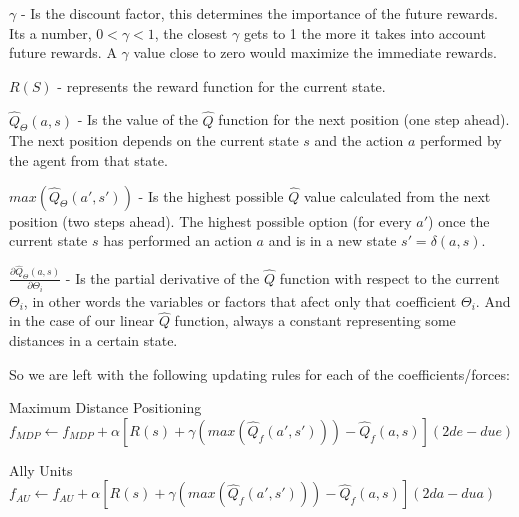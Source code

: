 \begin{flushleft}
$\gamma$  - Is the discount factor, this determines the importance of the future rewards. Its a number, $0 < \gamma < 1$, the closest $\gamma$ gets to 1 the more it takes into account future rewards. A $\gamma$ value close to zero would maximize the immediate rewards. 
\end{flushleft} 

\begin{flushleft}
$R(S)$ -  represents the reward function for the current state.
\end{flushleft} 

\begin{flushleft}
$\hat{Q}_\Theta(a,s)$ - Is the value of the $\hat{Q}$ function for the next position (one step ahead). The next position depends on the current state $s$ and the action $a$ performed by the agent from that state.
\end{flushleft} 

\begin{flushleft}
$max(\hat{Q}_\Theta(a',s'))$ - Is the highest possible $\hat{Q}$ value calculated from the next position (two steps ahead). The highest possible option (for every $a'$) once the current state $s$ has performed an action $a$ and is in a new state $s' = \delta(a,s)$. 
\end{flushleft} 

\begin{flushleft}
$\frac{\partial \hat{Q}_\Theta(a,s)}{\partial\Theta_i}$  - Is the partial derivative of the $\hat{Q}$ function with respect to the current $\Theta_i$, in other words the variables or factors that afect only that coefficient $\Theta_i$. And in the case of our  linear $\hat{Q}$ function, always a constant representing some distances in a certain state. 
\end{flushleft} 

\begin{flushleft}
So we are left with the following updating rules for each of the coefficients/forces:
\end{flushleft} 

\begin{flushleft}
Maximum Distance Positioning 
$f_{MDP}  \leftarrow f_{MDP}  + \alpha [ R(s) + \gamma (max(\hat{Q}_{f} (a',s')))-\hat{Q}_{f} (a,s) ](2de - due)$
\end{flushleft} 

\begin{flushleft}
Ally Units  \\ 
$f_{AU}  \leftarrow f_{AU} + \alpha [ R(s) + \gamma (max(\hat{Q}_{f} (a',s')))-\hat{Q}_{f} (a,s) ](2da - dua)$ 
\end{flushleft} 

